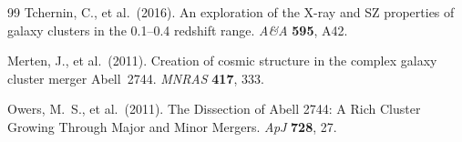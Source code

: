 \documentclass[12pt,a4paper]{article}
\begin{document}
\begin{thebibliography}{99}
Tchernin, C., et al.\ (2016).
An exploration of the X-ray and SZ properties of galaxy clusters in the 0.1--0.4 redshift range.
\textit{A\&A} \textbf{595}, A42.

Merten, J., et al.\ (2011).
Creation of cosmic structure in the complex galaxy cluster merger Abell~2744.
\textit{MNRAS} \textbf{417}, 333.

Owers, M.~S., et al.\ (2011).
The Dissection of Abell 2744: A Rich Cluster Growing Through Major and Minor Mergers.
\textit{ApJ} \textbf{728}, 27.

\end{thebibliography}
\end{document}
